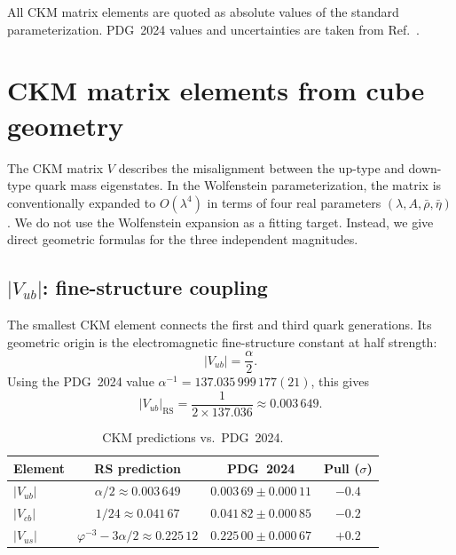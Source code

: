 \documentclass[11pt]{article}
\theoremstyle{remark}
\newcommand{\phig}{\varphi}
\begin{document}
All CKM matrix elements are quoted as absolute values of the
standard parameterization.  PDG~2024 values and uncertainties are
taken from Ref.~\cite{PDG2024}.

\section{CKM matrix elements from cube geometry}
\label{sec:CKM}

The CKM matrix $V$ describes the misalignment between the
up-type and down-type quark mass eigenstates.  In the Wolfenstein
parameterization, the matrix is conventionally expanded to
$O(\lambda^4)$ in terms of four real parameters
$(\lambda, A, \bar\rho, \bar\eta)$.  We do not use the Wolfenstein
expansion as a fitting target.  Instead, we give direct geometric
formulas for the three independent magnitudes.

\subsection{$|V_{ub}|$: fine-structure coupling}

The smallest CKM element connects the first and third quark
generations.  Its geometric origin is the electromagnetic
fine-structure constant at half strength:
\begin{equation}\label{eq:Vub}
  |V_{ub}| = \frac{\alpha}{2}.
\end{equation}
Using the PDG~2024 value $\alpha^{-1}=137.035\,999\,177(21)$,
this gives
\[
  |V_{ub}|_{\mathrm{RS}} = \frac{1}{2\times 137.036} \approx 0.003\,649.
\]

\begin{table}[h]
\centering
\caption{CKM predictions vs.\ PDG~2024.}
\label{tab:CKM}
\begin{tabular}{lccc}
\toprule
Element & RS prediction & PDG~2024 & Pull ($\sigma$) \\
\midrule
$|V_{ub}|$ & $\alpha/2 \approx 0.003\,649$
  & $0.003\,69 \pm 0.000\,11$ & $-0.4$ \\
$|V_{cb}|$ & $1/24 \approx 0.041\,67$
  & $0.041\,82 \pm 0.000\,85$ & $-0.2$ \\
$|V_{us}|$ & $\phig^{-3}-3\alpha/2 \approx 0.225\,12$
  & $0.225\,00 \pm 0.000\,67$ & $+0.2$ \\
\bottomrule
\end{tabular}
\end{table}
\end{document}
